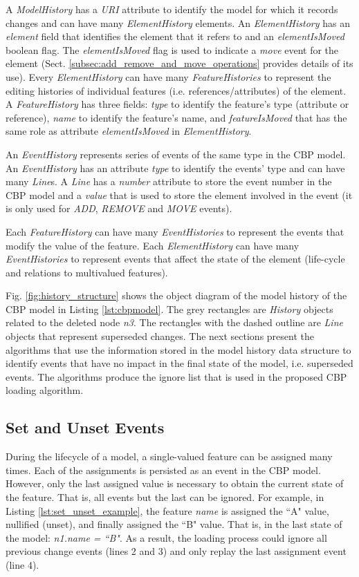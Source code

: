 \documentclass[12pt, a4paper]{report} \usepackage[titletoc]{appendix}
\begin{document}
A \emph{ModelHistory} has a \emph{URI} attribute to identify the model for which it records changes and can have many \emph{ElementHistory} elements. An \emph{ElementHistory} has an \emph{element} field that identifies the element that it refers to and an \emph{elementIsMoved} boolean flag. The  \emph{elementIsMoved} flag is used to indicate a \emph{move} event for the element (Sect. \ref{subsec:add_remove_and_move_operations} provides details of its use). Every \emph{ElementHistory} can have many \emph{FeatureHistories} to represent the editing histories of individual features (i.e. references/attributes) of the element.  A \emph{FeatureHistory} has three fields: \emph{type} to identify the feature's type (attribute or reference), \emph{name} to identify the feature's name, and \emph{featureIsMoved} that has the same role as attribute \emph{elementIsMoved} in \emph{ElementHistory}.

An \emph{EventHistory} represents series of events of the same type in the CBP model. An \emph{EventHistory} has an attribute \emph{type} to identify the events' type and can have many \emph{Line}s. A \emph{Line} has a \emph{number} attribute to store the event number in the CBP model and a \emph{value} that is used to store the element involved in the event (it is only used for \emph{ADD}, \emph{REMOVE} and \emph{MOVE} events).

Each \emph{FeatureHistory} can have many \emph{EventHistories} to represent the events that modify the value of the feature. Each \emph{ElementHistory} can have many \emph{EventHistories} to represent events that affect the state of the element (life-cycle and relations to multivalued features).

Fig. \ref{fig:history_structure} shows the object diagram of the model history of the CBP model in Listing \ref{lst:cbpmodel}. The grey rectangles are \emph{History} objects related to the deleted node \emph{n3}. The rectangles with the dashed outline are \emph{Line} objects that represent superseded changes. The next sections present the algorithms that use the information stored in the model history data structure to identify events that have no impact in the final state of the model, i.e. superseded events. The algorithms produce the ignore list that is used in the proposed CBP loading algorithm.

\subsection{Set and Unset Events}
\label{subsec:set_and_unset_events}
During the lifecycle of a model, a single-valued feature can be assigned many times. Each of the assignments is persisted as an event in the CBP model. However, only the last assigned value is necessary to obtain the current state of the feature.  That is, all events but the last can be ignored. For example, in Listing \ref{lst:set_unset_example}, the feature \emph{name} is assigned the ``A" value, nullified (unset), and finally assigned the ``B" value. That is, in the last state of the model: \emph{n1.name = ``B"}. As a result, the loading process could ignore all previous change events (lines 2 and 3) and only replay the last assignment event (line 4). 
\end{document}
